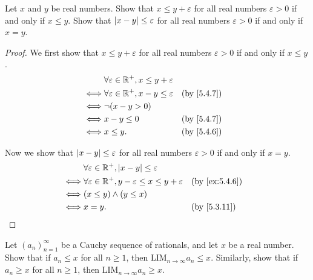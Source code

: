 \begin{ex}\label{ex:5.4.7}
  Let \(x\) and \(y\) be real numbers.
  Show that \(x \leq y + \varepsilon\) for all real numbers \(\varepsilon > 0\) if and only if \(x \leq y\).
  Show that \(\left\lvert x - y\right\rvert \leq \varepsilon\) for all real numbers \(\varepsilon > 0\) if and only if \(x = y\).
\end{ex}

\begin{proof}
  We first show that \(x \leq y + \varepsilon\) for all real numbers \(\varepsilon > 0\) if and only if \(x \leq y\).
  \begin{align*}
         & \forall \varepsilon \in \R^+, x \leq y + \varepsilon                 \\
    \iff & \forall \varepsilon \in \R^+, x - y \leq \varepsilon &  & \by{5.4.7} \\
    \iff & \lnot (x - y > 0)                                                    \\
    \iff & x - y \leq 0                                         &  & \by{5.4.7} \\
    \iff & x \leq y.                                            &  & \by{5.4.6}
  \end{align*}

  Now we show that \(\left\lvert x - y\right\rvert \leq \varepsilon\) for all real numbers \(\varepsilon > 0\) if and only if \(x = y\).
  \begin{align*}
         & \forall \varepsilon \in \R^+, \abs{x - y} \leq \varepsilon                                                 \\
    \iff & \forall \varepsilon \in \R^+, y - \varepsilon \leq x \leq y + \varepsilon &  & \text{(by \cref{ex:5.4.6})} \\
    \iff & (x \leq y) \land (y \leq x)                                                                                \\
    \iff & x = y.                                                                    &  & \text{(by \cref{5.3.11})}
  \end{align*}
\end{proof}

\begin{ex}\label{ex:5.4.8}
  Let \((a_n)_{n = 1}^{\infty}\) be a Cauchy sequence of rationals, and let \(x\) be a real number.
  Show that if \(a_n \leq x\) for all \(n \geq 1\), then \(\text{LIM}_{n \to \infty} a_n \leq x\).
  Similarly, show that if \(a_n \geq x\) for all \(n \geq 1\), then \(\text{LIM}_{n \to \infty} a_n \geq x\).
\end{ex}

